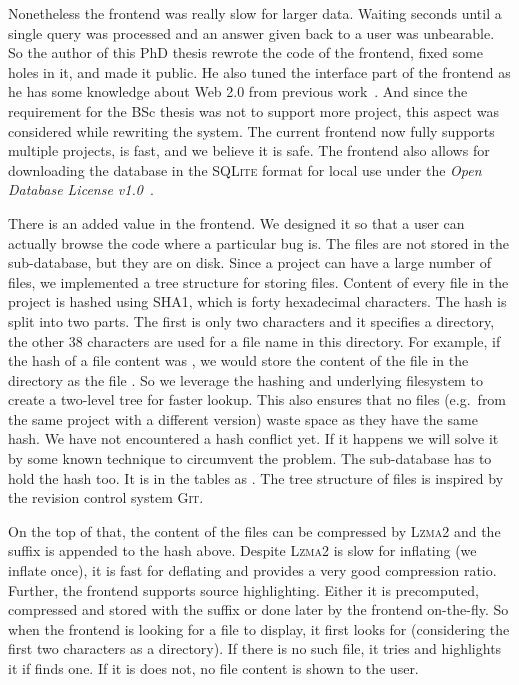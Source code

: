 Nonetheless the frontend was really slow for larger data. Waiting seconds until
a single query was processed and an answer given back to a user was
unbearable. So the author of this PhD thesis rewrote the code of the frontend,
fixed some holes in it, and made it public. He also tuned the interface part
of the frontend as he has some knowledge about Web 2.0 from previous
work~\cite{web2_isd}. And since the requirement for the BSc thesis was not to
support more project, this aspect was considered while rewriting the system.
The current frontend now fully supports multiple projects, is fast, and we
believe it is safe. The frontend also allows for downloading the database in
the \textsc{SQLite} format for local use under the \emph{Open Database License
v1.0}~\cite{ODbL}.

There is an added value in the frontend. We designed it so that a user can
actually browse the code where a particular bug is. The files are not stored
in the sub-database, but they are on disk. Since a project can have a large
number of files, we implemented a tree structure for storing files. Content
of every file in the project is hashed using SHA1, which is forty hexadecimal
characters. The hash is split into two parts. The first is only two characters
and it specifies a directory, the other 38 characters are used for a file name
in this directory. For example, if the hash of a file content was
, we would store the content of the file in the
directory  as the file . So we leverage the
hashing and underlying filesystem to create a two-level tree for faster
lookup. This also ensures that no files (e.g.\ from the same project with a
different version) waste space as they have the same hash. We have not
encountered a hash conflict yet. If it happens we will solve it by some known
technique to circumvent the problem. The sub-database has to hold the hash
too. It is in the  tables as . The tree
structure of files is inspired by the revision control system \textsc{Git}.

On the top of that, the content of the files can be compressed by
\textsc{Lzma2} and the suffix  is appended to the hash above.
Despite \textsc{Lzma2} is slow for inflating (we inflate once), it is fast for
deflating and provides a very good compression ratio. Further, the \cdb
frontend supports source highlighting. Either it is precomputed, compressed
and stored with the suffix  or done later by the frontend
on-the-fly.  So when the frontend is looking for a file to display, it first
looks for  (considering the first two characters as a
directory). If there is no such file, it tries  and highlights
it if finds one. If it is does not, no file content is shown to the user.

